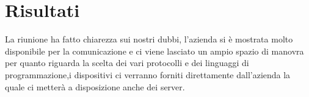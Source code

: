 \section{Risultati}
La riunione ha fatto chiarezza sui nostri dubbi, l'azienda si è mostrata molto disponibile per la comunicazione e ci viene lasciato un ampio spazio di manovra per quanto riguarda la scelta dei vari protocolli e dei linguaggi di programmazione,i dispositivi ci verranno forniti direttamente dall'azienda la quale ci metterà a disposizione anche dei server. 